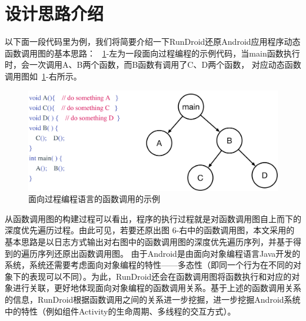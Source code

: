 
\section{设计思路介绍}
以下面一段代码里为例，我们将简要介绍一下RunDroid还原Android应用程序动态函数调用图的基本思路：
~\ref{fig:code_sample}-左为一段面向过程编程的示例代码，当main函数执行时，会一次调用A、B两个函数，而B函数有调用了C、D两个函数，
对应动态函数调用图如~\ref{fig:code_sample}-右所示。
 
 
 \begin{figure}
	\centering
	\includegraphics[width=\textwidth]{./Figures/code-sample.png}
	\caption{ 面向过程编程语言的函数调用的示例}
	\label{fig:code_sample}
\end{figure}


从函数调用图的构建过程可以看出，程序的执行过程就是对函数调用图自上而下的深度优先遍历过程。由此可见，若要还原出图 6-右中的函数调用图，本文采用的基本思路是以日志方式输出对右图中的函数调用图的深度优先遍历序列，并基于得到的遍历序列还原出函数调用图。
由于Android是由面向对象编程语言Java开发的系统，系统还需要考虑面向对象编程的特性——多态性（即同一个行为在不同的对象下的表现可以不同）。为此，RunDroid还会在函数调用图将函数执行和对应的对象进行关联，更好地体现面向对象编程的函数调用关系。基于上述的函数调用关系的信息，RunDroid根据函数调用之间的关系进一步挖掘，进一步挖掘Android系统中的特性（例如组件Activity的生命周期、多线程的交互方式）。

